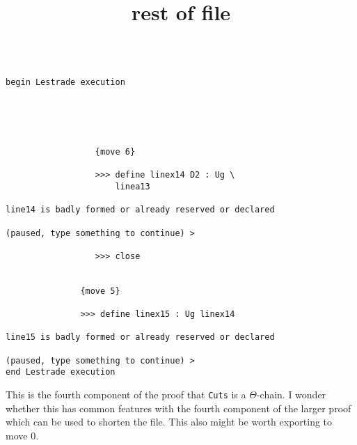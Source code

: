 \documentclass[12pt]{article}
\title {rest of file}
\begin{document}
\begin{verbatim}

begin Lestrade execution





                  {move 6}

                  >>> define linex14 D2 : Ug \
                      linea13

line14 is badly formed or already reserved or declared

(paused, type something to continue) >

                  >>> close


               {move 5}

               >>> define linex15 : Ug linex14

line15 is badly formed or already reserved or declared

(paused, type something to continue) >
end Lestrade execution
\end{verbatim}

This is the fourth component of the proof that {\tt Cuts} is a $\Theta$-chain.  I wonder whether this has common features with the fourth component of the larger proof
which can be used to shorten the file.  This also might be worth exporting to move 0.
\end{document}
